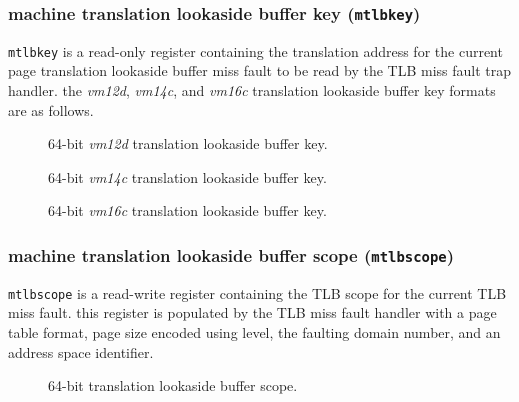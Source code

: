 \subsubsection{machine translation lookaside buffer key (\texttt{mtlbkey})}
\texttt{mtlbkey} is a read-only register containing the translation address
for the current page translation lookaside buffer miss fault to be read by
the TLB miss fault trap handler.
\para
the \emph{vm12d}, \emph{vm14c}, and \emph{vm16c} translation lookaside buffer
key formats are as follows.
\\
\begin{figure}[H]
\centering
{}
\caption{64-bit \emph{vm12d} translation lookaside buffer key.}
\label{fig:64-bit-vm12d-tlb-key-format}
\end{figure}

\begin{figure}[H]
\centering
{}
\caption{64-bit \emph{vm14c} translation lookaside buffer key.}
\label{fig:64-bit-vm14c-tlb-key}
\end{figure}

\begin{figure}[H]
\centering
{}
\caption{64-bit \emph{vm16c} translation lookaside buffer key.}
\label{fig:64-bit-vm16c-tlb-key}
\end{figure}

\newpage
\subsubsection{machine translation lookaside buffer scope (\texttt{mtlbscope})}
\texttt{mtlbscope} is a read-write register containing the TLB scope for
the current TLB miss fault. this register is populated by the TLB miss
fault handler with a page table format, page size encoded using level,
the faulting domain number, and an address space identifier.
\\
\begin{figure}[H]
\centering
{}
\caption{64-bit translation lookaside buffer scope.}
\label{fig:64-bit-tlb-scope}
\end{figure}

